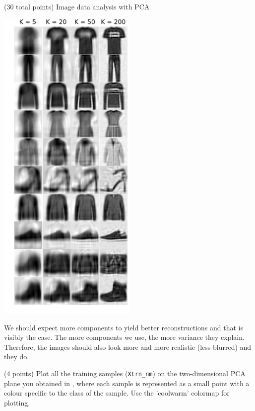 \documentclass[12pt]{article}
\begin{document}
\begin{question}{(30 total points) Image data analysis with PCA}
\begin{subquestion}
   

      \begin{answerbox}{52em}
             \begin{center}
	\includegraphics[width=0.5\textwidth]{imgs/1_7.png}
	\end{center}
	We should expect more components to yield better reconstructions and that is visibly the case. The more components we use, the more variance they explain. Therefore, the images should also look more and more realistic (less blurred) and they do.
      \end{answerbox}
  


   \end{subquestion}
   \begin{subquestion}{(4 points)
       Plot all the training samples (\texttt{Xtrn\_nm}) on the
       two-dimensional PCA plane you obtained in , where each sample is
       represented as a small point with a colour specific to the class of
       the sample.  Use the 'coolwarm' colormap for plotting.
     } \label{Q1.8}



\end{subquestion}
\end{question}
\end{document}
